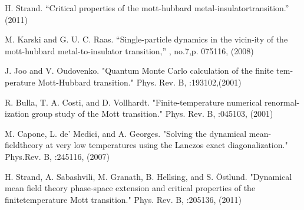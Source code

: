 \begin{thebibliography}{4}
{H. Strand. “Critical properties of the mott-hubbard metal-insulatortransition.” (2011)}

{M. Karski and G. U. C. Raas. “Single-particle dynamics in the vicin-ity of the mott-hubbard metal-to-insulator transition,” , no.7,p. 075116, (2008)}

{ J. Joo and V. Oudovenko. "Quantum Monte Carlo calculation of the finite tem-perature Mott-Hubbard transition." \f{Phys. Rev. B},  :193102,(2001) }

{R. Bulla, T. A. Costi, and D. Vollhardt. "Finite-temperature numerical renormal-ization group study of the Mott transition." \f{Phys. Rev. B}, :045103, (2001)}

{M. Capone, L. de’ Medici, and A. Georges.  "Solving the dynamical mean-fieldtheory at very low temperatures using the Lanczos exact diagonalization." \f{Phys.Rev. B}, :245116, (2007)}

{H. Strand, A. Sabashvili, M. Granath, B. Hellsing, and S. Östlund.  "Dynamical mean field theory phase-space extension and critical properties of the finitetemperature Mott transition." \f{Phys. Rev. B}, :205136, (2011)}

\end{thebibliography}

